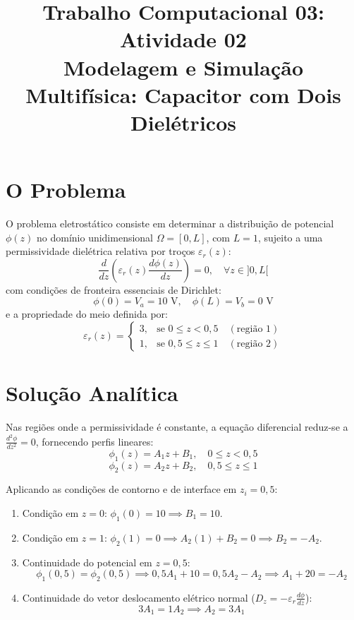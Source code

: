 \documentclass[12pt,a4paper]{article}
\title{\textbf{Trabalho Computacional 03: Atividade 02} \\ \large Modelagem e Simulação Multifísica: Capacitor com Dois Dielétricos}
\date{}
\begin{document}
\maketitle


\section{O Problema}
O problema eletrostático consiste em determinar a distribuição de potencial $\phi(z)$ no domínio unidimensional $\Omega = [0, L]$, com $L = 1$, sujeito a uma permissividade dielétrica relativa por troços $\varepsilon_r(z)$:
\begin{equation}
    \frac{d}{dz}\left(\varepsilon_r(z)\frac{d\phi(z)}{dz}\right) = 0, \quad \forall z \in ]0, L[
\end{equation}
com condições de fronteira essenciais de Dirichlet:
\begin{equation}
    \phi(0) = V_a = 10\text{ V}, \quad \phi(L) = V_b = 0\text{ V}
\end{equation}
e a propriedade do meio definida por:
\begin{equation}
    \varepsilon_r(z) = \begin{cases} 
        3, & \text{se } 0 \le z < 0{,}5 \quad (\text{região 1}) \\ 
        1, & \text{se } 0{,}5 \le z \le 1 \quad (\text{região 2}) 
    \end{cases}
\end{equation}

\section{Solução Analítica}
Nas regiões onde a permissividade é constante, a equação diferencial reduz-se a $\frac{d^2\phi}{dz^2} = 0$, fornecendo perfis lineares:
\begin{equation}
    \phi_1(z) = A_1 z + B_1, \quad 0 \le z < 0{,}5
\end{equation}
\begin{equation}
    \phi_2(z) = A_2 z + B_2, \quad 0{,}5 \le z \le 1
\end{equation}

Aplicando as condições de contorno e de interface em $z_i = 0{,}5$:
\begin{enumerate}
    \item Condição em $z = 0$: $\phi_1(0) = 10 \implies B_1 = 10$.
    \item Condição em $z = 1$: $\phi_2(1) = 0 \implies A_2(1) + B_2 = 0 \implies B_2 = -A_2$.
    \item Continuidade do potencial em $z = 0{,}5$:
    \begin{equation}
        \phi_1(0{,}5) = \phi_2(0{,}5) \implies 0{,}5 A_1 + 10 = 0{,}5 A_2 - A_2 \implies A_1 + 20 = -A_2
    \end{equation}
    \item Continuidade do vetor deslocamento elétrico normal ($D_z = -\varepsilon_r \frac{d\phi}{dz}$):
    \begin{equation}
        3 A_1 = 1 A_2 \implies A_2 = 3 A_1
    \end{equation}
\end{enumerate}
\end{document}
